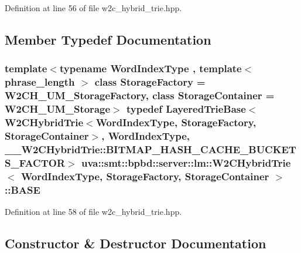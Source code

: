 Definition at line 56 of file w2c\+\_\+hybrid\+\_\+trie.\+hpp.



\subsection{Member Typedef Documentation}
\hypertarget{classuva_1_1smt_1_1bpbd_1_1server_1_1lm_1_1_w2_c_hybrid_trie_a32b183fa9be9ed16c3f99e1890893c8c}{}
\subsubsection[{B\+A\+S\+E}]{\setlength{\rightskip}{0pt plus 5cm}template$<$typename Word\+Index\+Type , template$<$ phrase\+\_\+length $>$ class Storage\+Factory = W2\+C\+H\+\_\+\+U\+M\+\_\+\+Storage\+Factory, class Storage\+Container  = W2\+C\+H\+\_\+\+U\+M\+\_\+\+Storage$>$ typedef {\bf Layered\+Trie\+Base}$<${\bf W2\+C\+Hybrid\+Trie}$<${\bf Word\+Index\+Type}, Storage\+Factory, Storage\+Container$>$, {\bf Word\+Index\+Type}, \+\_\+\+\_\+\+W2\+C\+Hybrid\+Trie\+::\+B\+I\+T\+M\+A\+P\+\_\+\+H\+A\+S\+H\+\_\+\+C\+A\+C\+H\+E\+\_\+\+B\+U\+C\+K\+E\+T\+S\+\_\+\+F\+A\+C\+T\+O\+R$>$ {\bf uva\+::smt\+::bpbd\+::server\+::lm\+::\+W2\+C\+Hybrid\+Trie}$<$ {\bf Word\+Index\+Type}, Storage\+Factory, Storage\+Container $>$\+::{\bf B\+A\+S\+E}}\label{classuva_1_1smt_1_1bpbd_1_1server_1_1lm_1_1_w2_c_hybrid_trie_a32b183fa9be9ed16c3f99e1890893c8c}


Definition at line 58 of file w2c\+\_\+hybrid\+\_\+trie.\+hpp.



\subsection{Constructor \& Destructor Documentation}
\hypertarget{classuva_1_1smt_1_1bpbd_1_1server_1_1lm_1_1_w2_c_hybrid_trie_a0e0d25fc61bb6a560ae0eff5e0b833c5}{}
